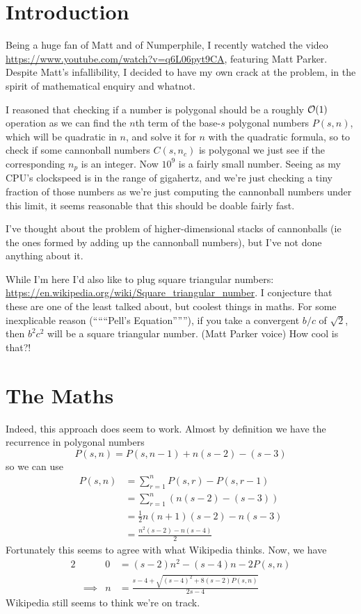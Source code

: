 \section{Introduction}

Being a huge fan of Matt and of Numperphile,
I recently watched the video \url{https://www.youtube.com/watch?v=q6L06pyt9CA},
featuring Matt Parker.  Despite Matt's infallibility, I decided to have my own
crack at the problem, in the spirit of mathematical enquiry and whatnot.

I reasoned that checking if a number is polygonal should be a roughly
\(\operatorname{\mathcal O}(1)\) operation as we can find the \(n\)th term of the base-\(s\)
polygonal numbers \(P(s, n)\), which will be quadratic in \(n\), and solve it
for \(n\) with the quadratic formula, so to check if some cannonball numbers
\(C(s, n_c)\) is polygonal we just see if the corresponding \(n_p\) is an
integer. Now \(10^9\) is a fairly small number. Seeing as my CPU's clockspeed is
in the range of gigahertz, and we're just checking a tiny fraction of those
numbers as we're just computing the cannonball numbers under this limit, it
seems reasonable that this should be doable fairly fast.

I've thought about the problem of higher-dimensional stacks of cannonballs (ie
the ones formed by adding up the cannonball numbers), but I've not done anything
about it.

While I'm here I'd also like to plug square triangular numbers:
\url{https://en.wikipedia.org/wiki/Square_triangular_number}. I conjecture that
these are one of the least talked about, but coolest things in maths. For some
inexplicable reason (``````Pell's Equation''''''), if you take a convergent
\(b / c\) of \(\sqrt 2\), then \(b^2 c^2\) will be a square triangular number.
(Matt Parker voice) How cool is that?!

\section{The Maths}

Indeed, this approach does seem to work. Almost by definition we have the
recurrence in polygonal numbers
\begin{equation*}
P(s, n) = P(s, n - 1) + n(s - 2) - (s - 3)
\end{equation*}
so we can use
\begin{align*}
P(s, n) &= \sum_{r = 1}^n P(s, r) - P(s, r - 1) \\
    &= \sum_{r = 1}^n (n(s - 2) - (s - 3)) \\
    &= \frac 12 n(n + 1)(s - 2) - n(s - 3) \\
    &= \frac{n^2(s - 2) - n(s - 4)} 2
\end{align*}
Fortunately this seems to agree with what Wikipedia thinks. Now, we have
\begin{alignat*}{2}
&& 0 &= (s - 2)n^2 - (s - 4)n - 2P(s, n) \\
&\implies& n &= \frac{s - 4 + \sqrt{(s - 4)^2 + 8(s - 2)P(s, n)}}{2s - 4}
\end{alignat*}
Wikipedia still seems to think we're on track.

